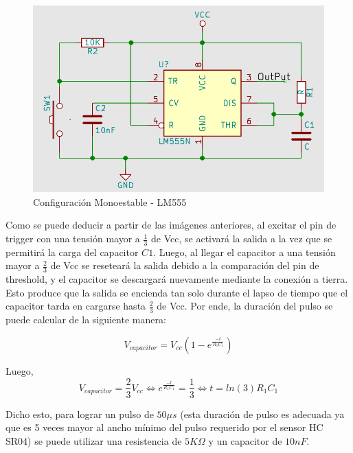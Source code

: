 \begin{figure}[H]
\centering
\includegraphics[scale=0.4]{monoestable555.PNG}
\caption{Configuración Monoestable - LM555}
\end{figure}

Como se puede deducir a partir de las imágenes anteriores, al excitar
el pin de trigger con una tensión mayor a $\frac{1}{3}$ de Vcc,
se activará la salida a la vez que se permitirá la carga del capacitor
$C1$. Luego, al llegar el capacitor a una tensión mayor a $\frac{2}{3}$
de Vcc se reseteará la salida debido a la comparación del pin de threshold,
y el capacitor se descargará nuevamente mediante la conexión a tierra.
Esto produce que la salida se encienda tan solo durante el lapso de
tiempo que el capacitor tarda en cargarse hasta $\frac{2}{3}$ de
Vcc. Por ende, la duración del pulso se puede calcular de la siguiente
manera:

\begin{equation}
V_{capacitor}=V_{cc}(1-e^{\frac{-t}{R_{1}C_{1}}})
\end{equation}

Luego, 
\vspace{5mm}
\begin{equation}
V_{capacitor}=\frac{2}{3}V_{cc}\Longleftrightarrow e^{\frac{-t}{R_{1}C_{1}}}=\frac{1}{3}\Longleftrightarrow t=ln(3)R_{1}C_{1}    
\end{equation}

\vspace{5mm}
Dicho esto, para lograr un pulso de $50\mu s$ (esta duración de pulso
es adecuada ya que es 5 veces mayor al ancho mínimo del pulso requerido
por el sensor HC SR04) se puede utilizar una resistencia de $5K\Omega$
y un capacitor de $10nF$.

